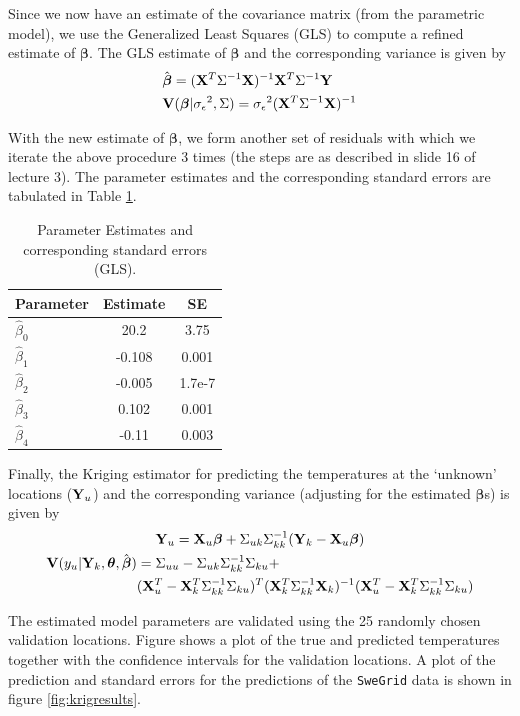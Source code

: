 \documentclass[a4paper,10pt]{article}
\def\bY{{\bf Y}}
\def\bX{{\bf X}}
\def\bV{{\bf V}}
\def\bbeta{{\boldsymbol \beta}}
\def\btheta{{\boldsymbol \theta}}
\def\sigmaeps{{\sigma_{\epsilon}}}
\begin{document}
Since we now have an estimate of the covariance matrix (from the parametric model), we use the Generalized Least Squares (GLS) to compute a refined estimate of $\bbeta$. The GLS estimate of $\bbeta$ and the corresponding variance is given by
\begin{align*}
& \hat \bbeta = (\bX^T \Sigma^{-1} \bX)^{-1} \bX^T \Sigma^{-1} \bY \\
& \bV(\bbeta | \sigmaeps^2, \Sigma) = \sigmaeps^2 (\bX^T \Sigma^{-1} \bX)^{-1}
\end{align*}

With the new estimate of $\bbeta$, we form another set of residuals with which we iterate the above procedure 3 times (the steps are as described in slide 16 of lecture 3). The parameter estimates and the corresponding standard errors are tabulated in Table \ref{tab:glsest}.
\begin{table}[ht]
\centering
\begin{tabular}{lcc}
\hline
{\bf Parameter} & {\bf Estimate} & {\bf SE }\\
\hline
$\hat \beta_0$ & 20.2 & 3.75 \\
$\hat \beta_1$ & -0.108 & 0.001\\
$\hat \beta_2$ & -0.005 & 1.7e-7 \\
$\hat \beta_3$ & 0.102 & 0.001\\
$\hat \beta_4$ & -0.11 & 0.003\\
\hline
\end{tabular}
\caption{Parameter Estimates and corresponding standard errors (GLS).}
\label{tab:glsest}
\end{table}

Finally, the Kriging estimator for predicting the temperatures at the `unknown' locations ($\bY_u$) and the corresponding variance (adjusting for the estimated $\bbeta$s) is given by
\begin{gather*}
\bY_u = \bX_u \bbeta + \Sigma_{uk} \Sigma_{kk}^{-1} (\bY_k - \bX_u \bbeta) \\
\begin{split}
\bV(y_u| \bY_k, \btheta, \hat \bbeta) &= \Sigma_{uu} -  \Sigma_{uk} \Sigma_{kk}^{-1}\Sigma_{ku} + \\
&(\bX_u^T - \bX_k^T \Sigma_{kk}^{-1}\Sigma_{ku})^T ( \bX_k^T \Sigma_{kk}^{-1} \bX_k)^{-1} (\bX_u^T - \bX_k^T \Sigma_{kk}^{-1}\Sigma_{ku})
\end{split}
\end{gather*}

The estimated model parameters are validated using the 25 randomly chosen validation locations. Figure shows a plot of the true and predicted temperatures together with the confidence intervals for the validation locations. A plot of the prediction and standard errors for the predictions of the {\texttt{SweGrid}} data is shown in figure \ref{fig:krigresults}.
\end{document}
